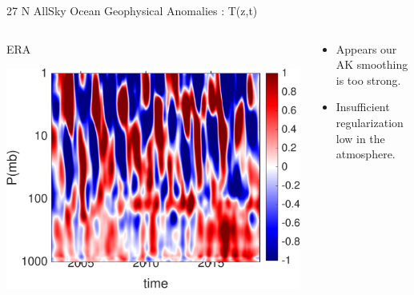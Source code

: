 \documentclass[10pt,t]{beamer}
\begin{document}

\begin{frame}{27 N AllSky Ocean Geophysical Anomalies : T(z,t)}
\vspace{-0.35in}

\begin{columns}
\begin{column}{0.55\columnwidth}
\begin{block}{\footnotesize ERA}
\vspace{-0.1in}
\begin{center}
\includegraphics[width=0.9\linewidth]{Figs/CloudAnom/Desc_ocean/ntropics27_era_cld_ptemp_anom_200209_201808.png}
\end{center}
\end{block}
\end{column}

\begin{column}{0.55\columnwidth}
\begin{block}{}
  \begin{itemize}
  \item Appears our AK smoothing is too strong.
    \item Insufficient regularization low in the atmosphere.
  \end{itemize}
\end{block}
\end{column}
\end{columns}

\vspace{-0.45in}


\end{frame}
\end{document}
